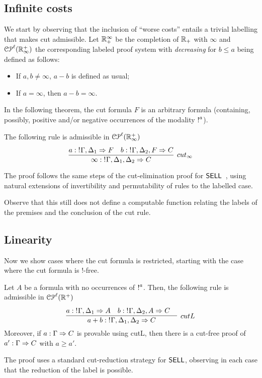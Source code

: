 \subsection{Infinite costs}
We start by observing that the inclusion of ``worse costs'' entails a trivial labelling 
that makes cut admissible. Let $\mathbb{R}_+^\infty$ be the completion of $\mathbb{R_+}$ with $\infty$ and $\mathcal{CP}^\ell(\mathbb{R}^{+}_\infty)$ the corresponding labeled proof system with {\em decreasing} for $b\leq a$ being defined as follows:
\begin{itemize}
\item If $a,b\not=\infty$, $a - b$ is defined as usual;
\item If $a=\infty$, then $a - b=\infty$.
 \end{itemize}
In the following theorem,  the cut formula $F$ is an arbitrary formula (containing, possibly, positive and/or negative occurrences of 
the modality $\hbox{$\mathop{!}^{a}$}$). 

\begin{theorem}
The following rule is admissible in $\mathcal{CP}^\ell(\mathbb{R}^{+}_\infty)$
$$
\infer[cut_\infty]{\infty: \nbang{}\Gamma,\Delta_1,\Delta_2 \seq C}{
 \deduce{a: \nbang{}\Gamma,\Delta_1 \seq F}{}&
  \deduce{b:\nbang{}\Gamma,\Delta_2, F \seq C}{}
 }
$$
\end{theorem}
The proof follows the same steps of the cut-elimination proof for $\textsf{SELL}$~\cite{DBLP:conf/kgc/DanosJS93,DBLP:journals/jar/NigamM10}, 
using natural extensions of invertibility and permutability of rules to the labelled case.

Observe that this still does not define a computable function relating the labels of the premises and the conclusion of the cut rule.
\subsection{Linearity}

Now we show cases where the cut formula is restricted, starting with the case where the cut formula is $!$-free. 
\begin{theorem}
Let $A$ be a formula with no occurrences of 
$\hbox{$\mathop{!}^{a}$}$. Then, the following rule is admissible in $\mathcal{CP}^\ell(\mathbb{R}^{+})$
$$
\infer[cutL]{a + b:\nbang{}\Gamma,\Delta_1,\Delta_2\seq  C}
{\deduce{a: \nbang{}\Gamma,\Delta_1 \seq A}{}&
 \deduce{b: \nbang{}\Gamma,\Delta_2, A \seq C}{}&
}
$$
Moreover, if $a: \Gamma \Rightarrow C$ is provable using cutL, then there is a cut-free proof of 
$a': \Gamma \Rightarrow C$ with $a \geq a'$.
\end{theorem}
The proof uses a standard cut-reduction strategy for $\textsf{SELL}$, observing in each case that the reduction of the label is possible. 

